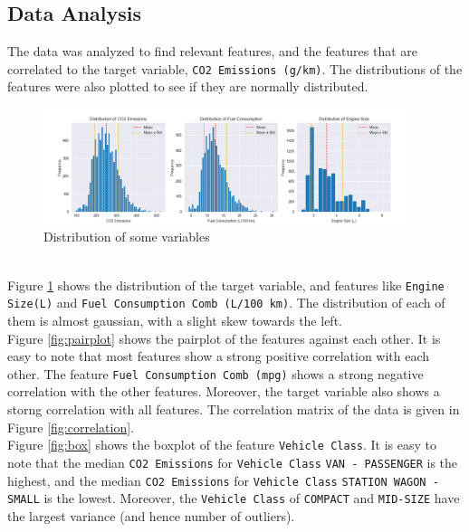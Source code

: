 \documentclass[12pt]{article}
\begin{document}
    \subsection*{Data Analysis}
    The data was analyzed to find relevant features, and the features that are correlated to the target variable,
    \texttt{CO2 Emissions (g/km)}. The distributions of the features were also plotted to see if they are normally
    distributed. \\
    \begin{figure}[h]
        \centering
        \includegraphics[width=0.95\textwidth]{./../Assets/distribution.png}
        \caption{Distribution of some variables}
        \label{fig:distribution}
    \end{figure}
    \vspace*{5pt} \\
    Figure \ref{fig:distribution} shows the distribution of the target variable, and features like \texttt{Engine Size(L)}
    and \texttt{Fuel Consumption Comb (L/100 km)}. The distribution of each of them is almost gaussian, with a slight
    skew towards the left.
    \vspace*{5pt} \\
    Figure \ref{fig:pairplot} shows the pairplot of the features against each other. It is easy to note that most
    features show a strong positive correlation with each other. The feature \texttt{Fuel Consumption Comb (mpg)} shows
    a strong negative correlation with the other features. Moreover, the target variable also shows a storng correlation
    with all features. The correlation matrix of the data is given in Figure \ref{fig:correlation}.
    \vspace*{5pt} \\
    Figure \ref{fig:box} shows the boxplot of the feature \texttt{Vehicle Class}. It is easy to note that the median
    \texttt{CO2 Emissions} for \texttt{Vehicle Class} \texttt{VAN - PASSENGER} is the highest, and the median \texttt{CO2 Emissions}
    for \texttt{Vehicle Class} \texttt{STATION WAGON - SMALL} is the lowest. Moreover, the \texttt{Vehicle Class} of
    \texttt{COMPACT} and \texttt{MID-SIZE} have the largest variance (and hence number of outliers).
\end{document}

